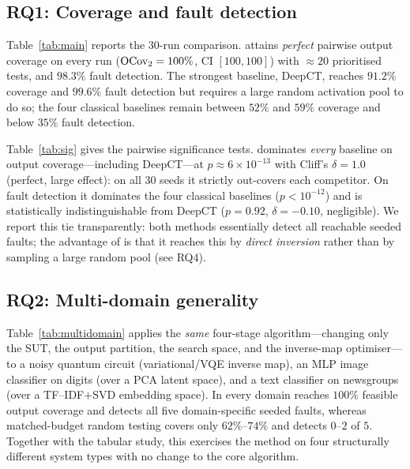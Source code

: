 \subsection{RQ1: Coverage and fault detection}
Table~\ref{tab:main} reports the 30-run comparison. \rnwise{} attains
\emph{perfect} pairwise output coverage on every run ($\mathrm{OCov}_2 = 100\%$,
CI $[100,100]$) with $\approx 20$ prioritised tests, and $98.3\%$ fault detection.
The strongest baseline, DeepCT, reaches $91.2\%$ coverage and $99.6\%$ fault
detection but requires a large random activation pool to do so; the four classical
baselines remain between $52\%$ and $59\%$ coverage and below $35\%$ fault
detection.

\begin{table}[t]
\centering
\caption{Main comparison on UCI Adult + XGBoost (pairwise, 30 runs).
Means with $95\%$ bootstrap CIs.}
\label{tab:main}

\end{table}

Table~\ref{tab:sig} gives the pairwise significance tests. \rnwise{} dominates
\emph{every} baseline on output coverage---including DeepCT---at
$p\approx 6\times10^{-13}$ with Cliff's $\delta=1.0$ (perfect, large effect):
on all 30 seeds it strictly out-covers each competitor. On fault detection it
dominates the four classical baselines ($p<10^{-12}$) and is statistically
indistinguishable from DeepCT ($p=0.92$, $\delta=-0.10$, negligible). We report
this tie transparently: both methods essentially detect all reachable seeded
faults; the advantage of \rnwise{} is that it reaches this by \emph{direct
inversion} rather than by sampling a large random pool (see RQ4).

\begin{table}[t]
\centering
\caption{Pairwise Mann--Whitney $U$ (\rnwise{} $>$ baseline) with Cliff's
$\delta$. $^{*}$ denotes $p<0.05$.}
\label{tab:sig}

\end{table}

\subsection{RQ2: Multi-domain generality}
Table~\ref{tab:multidomain} applies the \emph{same} four-stage algorithm---changing
only the SUT, the output partition, the search space, and the inverse-map
optimiser---to a noisy quantum circuit (variational/VQE inverse map), an MLP image
classifier on digits (over a PCA latent space), and a text classifier on
newsgroups (over a TF--IDF$+$SVD embedding space). In every domain \rnwise{}
reaches $100\%$ feasible output coverage and detects all five domain-specific
seeded faults, whereas matched-budget random testing covers only $62\%$--$74\%$
and detects $0$--$2$ of $5$. Together with the tabular study, this exercises the
method on four structurally different system types with no change to the core
algorithm.

